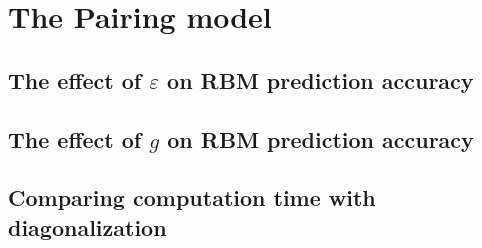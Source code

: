 \section{The Pairing model}
\subsection{The effect of \texorpdfstring{$\varepsilon$}{epsilon} on RBM prediction accuracy}
\subsection{The effect of \texorpdfstring{$g$}{g} on RBM prediction accuracy}
\subsection{Comparing computation time with diagonalization}
